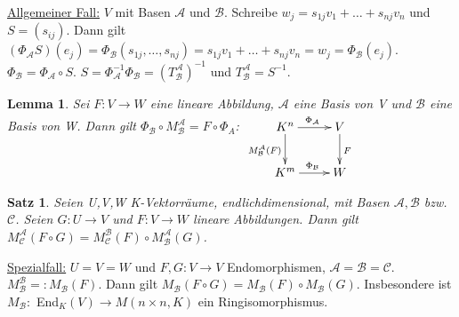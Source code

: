 \documentclass[12pt,a4paper]{article}
\theoremstyle{plain}
\newtheorem{Satz}[Theorem]{Satz}
\newtheorem{Lemma}[Theorem]{Lemma}
\numberwithin{equation}{section}
\begin{document}
\underline{Allgemeiner Fall:} $V$ mit Basen $\mathcal{A}$ und $\mathcal{B}$. Schreibe $w_j=s_{1j}v_1+\ldots+s_{nj}v_n$ und $S=(s_{ij})$. Dann gilt $(\Phi_\mathcal{A}S)(e_j)=\Phi_\mathcal{B}(s_{1j},\ldots,s_{nj})=s_{1j}v_1+\ldots+s_{nj}v_n=w_j=\Phi_\mathcal{B}(e_j)$. $\Phi_\mathcal{B}=\Phi_\mathcal{A}\circ S$. $S=\Phi^{-1}_\mathcal{A} \Phi_\mathcal{B} = (T^\mathcal{A}_\mathcal{B})^{-1}$ und $T^\mathcal{A}_\mathcal{B}=S^{-1}$.
\begin{Lemma}
Sei $F:V\rightarrow W$ eine lineare Abbildung, $\mathcal{A}$ eine Basis von V und $\mathcal{B}$ eine Basis von W. Dann gilt $\Phi_\mathcal{B}\circ M^\mathcal{A}_\mathcal{B}=F\circ \Phi_A$: $ \begin{xy} \xymatrix{ 	K^n \ar[r]^{\Phi_\mathcal{A}} \ar[d]_{M^\mathcal{A}_\mathcal{B}(F)} & V \ar[d]^F \\	K^m \ar[r]^{\Phi_\mathcal{B}} & W }\end{xy} $
\end{Lemma}
\begin{Satz}
Seien U,V,W K-Vektorräume, endlichdimensional, mit Basen $\mathcal{A},\mathcal{B}$ bzw. $\mathcal{C}$. Seien $G:U\rightarrow V$ und $F: V\rightarrow W$ lineare Abbildungen. Dann gilt $M^\mathcal{A}_\mathcal{C}(F\circ G)=M^\mathcal{B}_\mathcal{C}(F)\circ M^\mathcal{A}_\mathcal{B}(G)$.
\end{Satz}
\underline{Spezialfall:} $U=V=W$ und $F,G:V\rightarrow V$ Endomorphismen, $\mathcal{A}=\mathcal{B}=\mathcal{C}$. $M^\mathcal{B}_\mathcal{B}=:M_\mathcal{B}(F)$. Dann gilt $M_\mathcal{B}(F\circ G)=M_\mathcal{B}(F)\circ M_\mathcal{B}(G)$. Insbesondere ist $M_\mathcal{B}: $ End$_K(V)\rightarrow M(n\times n,K)$ ein Ringisomorphismus.
\end{document}
